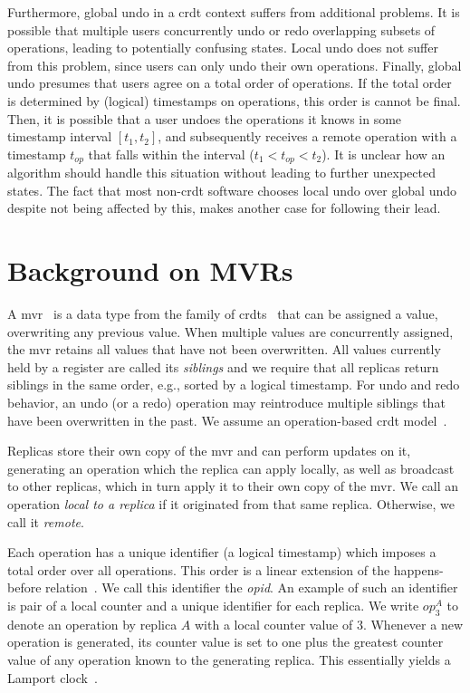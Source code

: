 \documentclass[sigplan,natbib=false,review]{acmart}
\newcommand{\op}[3][op]{$\mathit{#1}_{#2}^{#3}$} %
\begin{document}
Furthermore, global undo in a \gls{crdt} context suffers from additional problems.
It is possible that multiple users concurrently undo or redo overlapping subsets
of operations, leading to potentially confusing states.
Local undo does not suffer from this problem, since users can only undo 
their own operations.
Finally, global undo presumes that users agree on a total order of operations.
If the total order is determined by (logical) timestamps on operations,
this order is cannot be final.
Then, it is possible that a user undoes the operations
it knows in some timestamp interval $[t_1, t_2]$, and subsequently receives
a remote operation with a timestamp $t_{op}$ that falls within the
interval ($t_1 < t_{op} < t_2$).
It is unclear how an algorithm should handle this situation without leading
to further unexpected states.
The fact that most non-\gls{crdt} software chooses local undo over global undo
despite not being affected by this, makes another case for following their lead.

\section{Background on MVRs}\label{sec:background}

A \acrfull{mvr}~\cite{shapiro2011comprehensive} is a data type from the family
of \glspl*{crdt}~\cite{preguicca2018conflict} 
that can be assigned a value, overwriting any previous value.
When multiple values are concurrently assigned, the \gls*{mvr} retains all
values that have not been overwritten.
All values currently held by a register are called its \emph{siblings}
and we require that all replicas return siblings in the same order, e.g.,
sorted by a logical timestamp.
For undo and redo behavior, an undo (or a redo) operation
may reintroduce multiple siblings that have been overwritten in the past.
We assume an operation-based \gls*{crdt} model~\cite{baquero2017pure}.

Replicas store their own copy of the \gls{mvr} and can perform updates on it,
generating an operation which the replica can apply locally,
as well as broadcast to other replicas, which in turn apply it to their own
copy of the \gls{mvr}.
We call an operation \emph{local to a replica} if it originated from that
same replica.
Otherwise, we call it \emph{remote}.

Each operation has a unique identifier (a logical timestamp)
which imposes a total order over all operations.
This order is a linear extension of the happens-before relation~\cite{lamport1978time}.
We call this identifier the \emph{\gls*{opid}}.
An example of such an identifier is pair of a local counter and a unique identifier
for each replica.
We write \op{3}{A} to denote an operation by replica $A$
with a local counter value of $3$.
Whenever a new operation is generated, its counter value is set to one plus
the greatest counter value of any operation known to the generating replica.
This essentially yields a Lamport clock~\cite{lamport1978time}.
\end{document}
